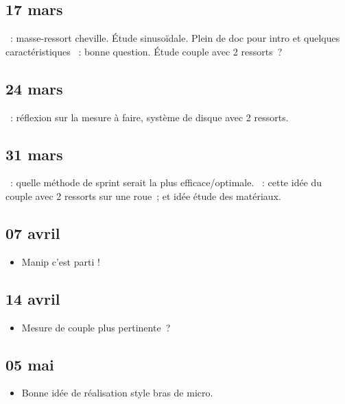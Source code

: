 \documentclass[a4paper, 11pt, final, garamond]{book}
\begin{document}
\subsection{17 mars}
\begin{itemize}
    ~: masse-ressort cheville. Étude sinusoïdale. Plein de doc pour
        intro et quelques caractéristiques
    ~: bonne question. Étude couple avec 2 ressorts~?
\end{itemize}

\subsection{24 mars}
\begin{itemize}
    ~: réflexion sur la mesure à faire, système de disque avec 2
        ressorts.
\end{itemize}

\subsection{31 mars}
\begin{itemize}
  ~: quelle méthode de sprint serait la plus efficace/optimale.
  ~: cette idée du couple avec 2 ressorts sur une roue~; et idée
    étude des matériaux.
\end{itemize}

\subsection{07 avril}
\begin{itemize}
  \item Manip c'est parti !
\end{itemize}

\subsection{14 avril}
\begin{itemize}
  \item Mesure de couple plus pertinente~?
\end{itemize}

\subsection{05 mai}
\begin{itemize}
  \item Bonne idée de réalisation style bras de micro.
\end{itemize}
\end{document}
